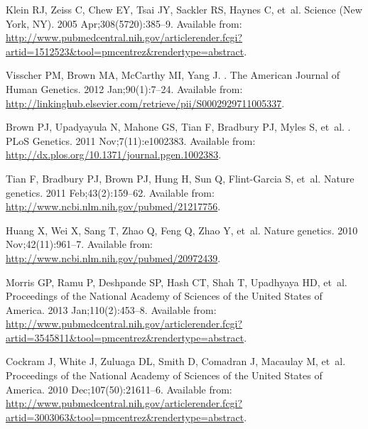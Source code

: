 \documentclass[10pt,letterpaper]{article}
\begin{document}
\begin{thebibliography}{10}

Klein RJ, Zeiss C, Chew EY, Tsai JY, Sackler RS, Haynes C, et~al.
\newblock Science (New York, NY). 2005 Apr;308(5720):385--9.
\newblock Available from:
  \url{http://www.pubmedcentral.nih.gov/articlerender.fcgi?artid=1512523\&tool=pmcentrez\&rendertype=abstract}.

Visscher PM, Brown MA, McCarthy MI, Yang J.
.
\newblock The American Journal of Human Genetics. 2012 Jan;90(1):7--24.
\newblock Available from:
  \url{http://linkinghub.elsevier.com/retrieve/pii/S0002929711005337}.

Brown PJ, Upadyayula N, Mahone GS, Tian F, Bradbury PJ, Myles S, et~al.
.
\newblock PLoS Genetics. 2011 Nov;7(11):e1002383.
\newblock Available from:
  \url{http://dx.plos.org/10.1371/journal.pgen.1002383}.

Tian F, Bradbury PJ, Brown PJ, Hung H, Sun Q, Flint-Garcia S, et~al.
\newblock Nature genetics. 2011 Feb;43(2):159--62.
\newblock Available from: \url{http://www.ncbi.nlm.nih.gov/pubmed/21217756}.

Huang X, Wei X, Sang T, Zhao Q, Feng Q, Zhao Y, et~al.
\newblock Nature genetics. 2010 Nov;42(11):961--7.
\newblock Available from: \url{http://www.ncbi.nlm.nih.gov/pubmed/20972439}.

Morris GP, Ramu P, Deshpande SP, Hash CT, Shah T, Upadhyaya HD, et~al.
\newblock Proceedings of the National Academy of Sciences of the United States
  of America. 2013 Jan;110(2):453--8.
\newblock Available from:
  \url{http://www.pubmedcentral.nih.gov/articlerender.fcgi?artid=3545811\&tool=pmcentrez\&rendertype=abstract}.

Cockram J, White J, Zuluaga DL, Smith D, Comadran J, Macaulay M, et~al.
\newblock Proceedings of the National Academy of Sciences of the United States
  of America. 2010 Dec;107(50):21611--6.
\newblock Available from:
  \url{http://www.pubmedcentral.nih.gov/articlerender.fcgi?artid=3003063\&tool=pmcentrez\&rendertype=abstract}.


\end{thebibliography}
\end{document}
